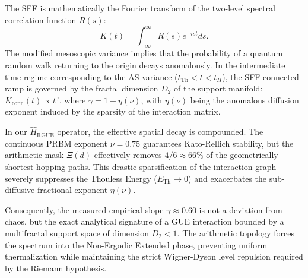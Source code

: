 \documentclass[aps,prl,preprint,superscriptaddress,floatfix]{revtex4-2}
\begin{document}
The SFF is mathematically the Fourier transform of the two-level spectral correlation function $R(s)$:
\begin{equation}
K(t) = \int_{-\infty}^{\infty} R(s) e^{-ist} ds.
\end{equation}
The modified mesoscopic variance implies that the probability of a quantum random walk returning to the origin decays anomalously. In the intermediate time regime corresponding to the AS variance ($t_{\text{Th}} < t < t_H$), the SFF connected ramp is governed by the fractal dimension $D_2$ of the support manifold: $K_{\text{conn}}(t) \propto t^{\gamma}$, where $\gamma = 1 - \eta(\nu)$, with $\eta(\nu)$ being the anomalous diffusion exponent induced by the sparsity of the interaction matrix. 

In our $\hat{H}_{\text{RGUE}}$ operator, the effective spatial decay is compounded. The continuous PRBM exponent $\nu=0.75$ guarantees Kato-Rellich stability, but the arithmetic mask $\Xi(d)$ effectively removes $4/6 \approx 66\%$ of the geometrically shortest hopping paths. This drastic sparsification of the interaction graph severely suppresses the Thouless Energy ($E_{\text{Th}} \to 0$) and exacerbates the sub-diffusive fractional exponent $\eta(\nu)$.

Consequently, the measured empirical slope $\gamma \approx 0.60$ is not a deviation from chaos, but the exact analytical signature of a GUE interaction bounded by a multifractal support space of dimension $D_2 < 1$. The arithmetic topology forces the spectrum into the Non-Ergodic Extended phase, preventing uniform thermalization while maintaining the strict Wigner-Dyson level repulsion required by the Riemann hypothesis.



\end{document}
